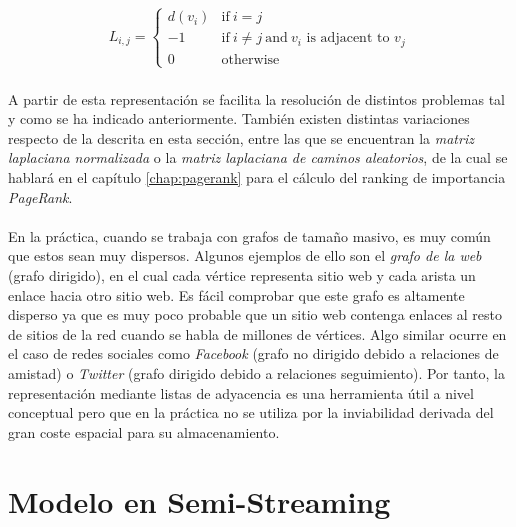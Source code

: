 \documentclass{subfiles}
\begin{document}
          \begin{align}
          \label{eq:laplacian_matrix}
            L_{{i,j}} = {\begin{cases}
              d(v_{i})&{\mbox{if}}\ i=j\\
              -1&{\mbox{if}}\ i\neq j\ {\mbox{and}}\ v_{i}{\mbox{ is adjacent to }}v_{j}\\
              0&{\mbox{otherwise}}\end{cases}}
          \end{align}

          \paragraph{}
          A partir de esta representación se facilita la resolución de distintos problemas tal y como se ha indicado anteriormente. También existen distintas variaciones respecto de la descrita en esta sección, entre las que se encuentran la \emph{matriz laplaciana normalizada} o la \emph{matriz laplaciana de caminos aleatorios}, de la cual se hablará en el capítulo \ref{chap:pagerank} para el cálculo del ranking de importancia \emph{PageRank}.


      \paragraph{}
      En la práctica, cuando se trabaja con grafos de tamaño masivo, es muy común que estos sean muy dispersos. Algunos ejemplos de ello son el \emph{grafo de la web} (grafo dirigido), en el cual cada vértice representa sitio web y cada arista un enlace hacia otro sitio web. Es fácil comprobar que este grafo es altamente disperso ya que es muy poco probable que un sitio web contenga enlaces al resto de sitios de la red cuando se habla de millones de vértices. Algo similar ocurre en el caso de redes sociales como \emph{Facebook} (grafo no dirigido debido a relaciones de amistad) o \emph{Twitter} (grafo dirigido debido a relaciones seguimiento). Por tanto, la representación mediante listas de adyacencia es una herramienta útil a nivel conceptual pero que en la práctica no se utiliza por la inviabilidad derivada del gran coste espacial para su almacenamiento.

    \section{Modelo en Semi-Streaming}
    \label{sec:semi_streaming_model}
\end{document}
